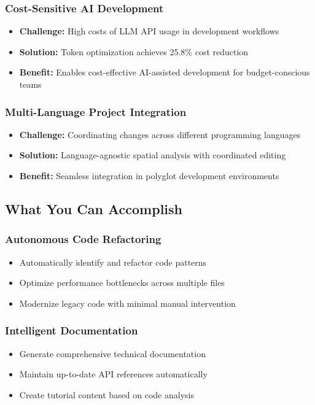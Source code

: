 \documentclass[12pt,a4paper]{article}
\begin{document}
\subsubsection{Cost-Sensitive AI Development}
\begin{itemize}
    \item \textbf{Challenge:} High costs of LLM API usage in development workflows
    \item \textbf{Solution:} Token optimization achieves 25.8\% cost reduction
    \item \textbf{Benefit:} Enables cost-effective AI-assisted development for budget-conscious teams
\end{itemize}

\subsubsection{Multi-Language Project Integration}
\begin{itemize}
    \item \textbf{Challenge:} Coordinating changes across different programming languages
    \item \textbf{Solution:} Language-agnostic spatial analysis with coordinated editing
    \item \textbf{Benefit:} Seamless integration in polyglot development environments
\end{itemize}

\subsection{What You Can Accomplish}

\subsubsection{Autonomous Code Refactoring}
\begin{itemize}
    \item Automatically identify and refactor code patterns
    \item Optimize performance bottlenecks across multiple files
    \item Modernize legacy code with minimal manual intervention
\end{itemize}

\subsubsection{Intelligent Documentation}
\begin{itemize}
    \item Generate comprehensive technical documentation
    \item Maintain up-to-date API references automatically
    \item Create tutorial content based on code analysis
\end{itemize}
\end{document}
